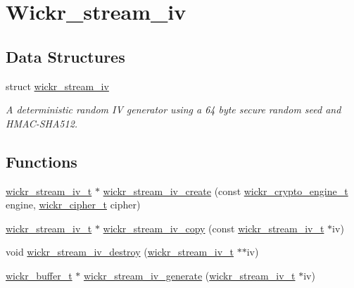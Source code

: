 \hypertarget{group__wickr__stream__iv}{}\section{Wickr\+\_\+stream\+\_\+iv}
\label{group__wickr__stream__iv}
\subsection*{Data Structures}
\begin{DoxyCompactItemize}
\item 
struct \mbox{\hyperlink{structwickr__stream__iv}{wickr\+\_\+stream\+\_\+iv}}
\begin{DoxyCompactList}\small\item\em A deterministic random IV generator using a 64 byte secure random seed and H\+M\+A\+C-\/\+S\+H\+A512. \end{DoxyCompactList}\end{DoxyCompactItemize}
\subsection*{Functions}
\begin{DoxyCompactItemize}
\item 
\mbox{\hyperlink{structwickr__stream__iv}{wickr\+\_\+stream\+\_\+iv\+\_\+t}} $\ast$ \mbox{\hyperlink{group__wickr__stream__iv_gaaad5726a228b7866b0cb392c131f95be}{wickr\+\_\+stream\+\_\+iv\+\_\+create}} (const \mbox{\hyperlink{structwickr__crypto__engine}{wickr\+\_\+crypto\+\_\+engine\+\_\+t}} engine, \mbox{\hyperlink{structwickr__cipher}{wickr\+\_\+cipher\+\_\+t}} cipher)
\item 
\mbox{\hyperlink{structwickr__stream__iv}{wickr\+\_\+stream\+\_\+iv\+\_\+t}} $\ast$ \mbox{\hyperlink{group__wickr__stream__iv_gaec8a5b5d70a86997c8158d047c7eed34}{wickr\+\_\+stream\+\_\+iv\+\_\+copy}} (const \mbox{\hyperlink{structwickr__stream__iv}{wickr\+\_\+stream\+\_\+iv\+\_\+t}} $\ast$iv)
\item 
void \mbox{\hyperlink{group__wickr__stream__iv_gad6ac87d891822a866a0d7cad48f79e27}{wickr\+\_\+stream\+\_\+iv\+\_\+destroy}} (\mbox{\hyperlink{structwickr__stream__iv}{wickr\+\_\+stream\+\_\+iv\+\_\+t}} $\ast$$\ast$iv)
\item 
\mbox{\hyperlink{structwickr__buffer}{wickr\+\_\+buffer\+\_\+t}} $\ast$ \mbox{\hyperlink{group__wickr__stream__iv_gaddcfdc9904ec0ffd32ce8f988aefc484}{wickr\+\_\+stream\+\_\+iv\+\_\+generate}} (\mbox{\hyperlink{structwickr__stream__iv}{wickr\+\_\+stream\+\_\+iv\+\_\+t}} $\ast$iv)
\end{DoxyCompactItemize}



